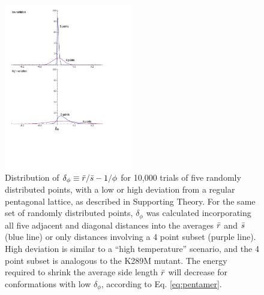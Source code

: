 \documentclass[9pt,onecolumn,oneside,lineno]{pnas-new}
\begin{document}
\begin{figure}
\begin{center}
\includegraphics[width = 0.5\textwidth]{figures_2/delta_phi_distribution.pdf}
\end{center}
\caption{Distribution of $\delta_{\phi} \equiv \bar{r}/\bar{s} - 1/\phi$ for 10,000 trials of five randomly distributed points, with a low or high deviation from a regular pentagonal lattice, as described in Supporting Theory. For the same set of randomly distributed points, $\delta_{\phi}$ was calculated incorporating all five adjacent and diagonal distances into the averages $\bar{r}$ and $\bar{s}$ (blue line) or only distances involving a 4 point subset (purple line). High deviation is similar to a ``high temperature'' scenario, and the 4 point subset is analogous to the K289M mutant. The energy required to shrink the average side length $\bar{r}$ will decrease for conformations with low $\delta_{\phi}$, according to Eq. \ref{eq:pentamer}.  }
\label{fig:avgdist}
\end{figure}
\end{document}
